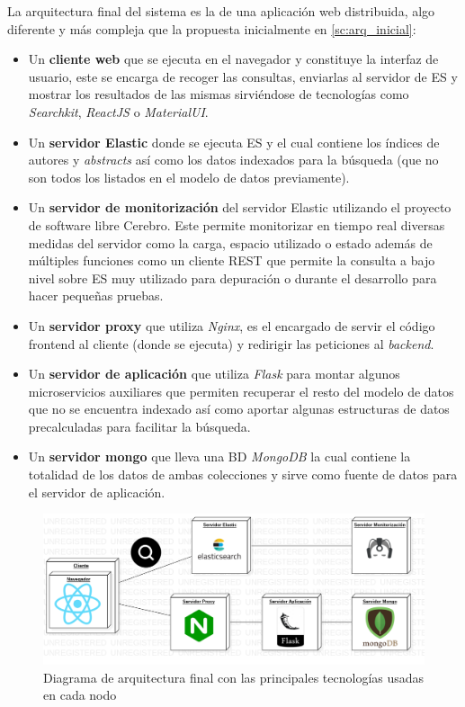 La arquitectura final del sistema es la de una aplicación web distribuida, algo diferente y más compleja que la propuesta inicialmente en \ref{sc:arq_inicial}:
\begin{itemize}
	\item Un \textbf{cliente web} que se ejecuta en el navegador y constituye la interfaz de usuario, este se encarga de recoger las consultas, enviarlas al servidor de \acrfull{ES} y mostrar los resultados de las mismas sirviéndose de tecnologías como \textit{Searchkit}, \textit{ReactJS} o \textit{MaterialUI}. 
	
	\item Un \textbf{servidor Elastic} donde se ejecuta \acrshort{ES} y el cual contiene los índices de autores y \textit{abstracts} así como los datos indexados para la búsqueda (que no son todos los listados en el modelo de datos previamente).
	
	\item Un \textbf{servidor de monitorización} del servidor Elastic utilizando el proyecto de software libre Cerebro. Este permite monitorizar en tiempo real diversas medidas del servidor como la carga, espacio utilizado o estado además de múltiples funciones como un cliente REST que permite la consulta a bajo nivel sobre \acrshort{ES} muy utilizado para depuración o durante el desarrollo para hacer pequeñas pruebas.
	
	\item Un \textbf{servidor proxy} que utiliza \textit{Nginx}, es el encargado de servir el código \gls{frontend} al cliente (donde se ejecuta) y redirigir las peticiones al \textit{backend}.
		
	\item Un \textbf{servidor de aplicación} que utiliza \textit{Flask} para montar algunos microservicios auxiliares que permiten recuperar el resto del modelo de datos que no se encuentra indexado así como aportar algunas estructuras de datos precalculadas para facilitar la búsqueda. 
	
	\item Un \textbf{servidor mongo} que lleva una \acrshort{BD} \textit{MongoDB} la cual contiene la totalidad de los datos de ambas colecciones y sirve como fuente de datos para el servidor de aplicación.
	
\end{itemize}

\begin{figure}[ht]
	
	\centering
	\includegraphics[width=0.9\linewidth]{imagenes/architecture}
	\caption{Diagrama de arquitectura final con las principales tecnologías usadas en cada nodo}
	\label{fig:finalArchitecture}
\end{figure}